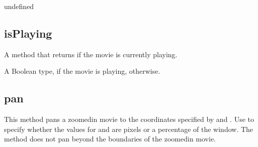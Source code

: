 \documentclass[letterpaper,12pt,english,openany,oneside]{sphinxmanual}
\begin{document}
\begin{sphinxVerbatim}[commandchars=\\\{\}]
\end{sphinxVerbatim}
\label{\detokenize{JS_3D_API:parameters-16}}

\label{\detokenize{JS_3D_API:section-27}}\label{\detokenize{JS_3D_API:returns-23}}

undefined


\subsection{isPlaying}
\label{\detokenize{JS_3D_API:isplaying}}
A method that returns  if the movie is currently playing.

\label{\detokenize{JS_3D_API:syntax-24}}

\begin{sphinxVerbatim}[commandchars=\\\{\}]
\end{sphinxVerbatim}
\label{\detokenize{JS_3D_API:returns-24}}

A Boolean type,  if the movie is playing,  otherwise.


\subsection{pan}
\label{\detokenize{JS_3D_API:pan}}
This method pans a zoomed\sphinxhyphen{}in movie to the coordinates specified by  and . Use  to specify whether the values for  and  are pixels or a percentage of the window. The  method does not pan beyond the boundaries of the zoomed\sphinxhyphen{}in movie.

\label{\detokenize{JS_3D_API:syntax-25}}

\begin{sphinxVerbatim}[commandchars=\\\{\}]
  
\end{sphinxVerbatim}
\label{\detokenize{JS_3D_API:parameters-17}}
\end{document}
